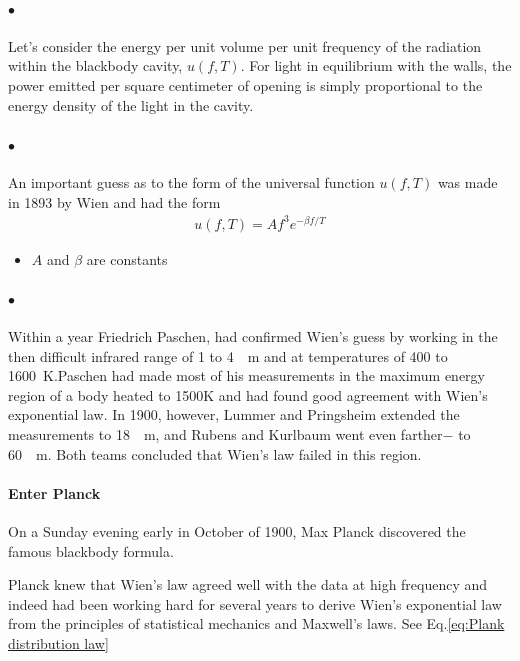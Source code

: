 \documentclass[a4paper]{report}
\begin{document}
            \paragraph{$\bullet$} Let's consider the energy per unit volume per unit frequency of 
            the radiation within the blackbody cavity, $u( f, T )$. For light in equilibrium with 
            the walls, the power emitted per square centimeter of opening is simply proportional to 
            the energy density of the light in the cavity.

            \paragraph{$\bullet$} An important guess as to the form of the universal function $u(f, T)$ was
            made in 1893 by Wien and had the form 
            \begin{align} \label{Wien's exponential law}
                u(f,T) = A f^3 e^{- \beta f/T}
            \end{align}
            {\tiny \begin{itemize}
                \item $A$ and $\beta$ are constants
            \end{itemize}}

            \paragraph{$\bullet$} Within a year Friedrich Paschen, had confirmed Wien’s guess 
            by working in the then difficult infrared range of 1 to \SI{4}{\mu\m} and at temperatures 
            of 400 to \SI{1600}{\K}.Paschen had made most of his 
            measurements in the maximum energy region of a body heated to 1500K and had found good 
            agreement with Wien’s exponential law. In 1900, however, Lummer and Pringsheim extended 
            the measurements to \SI{18}{\mu\m}, and Rubens and Kurlbaum went even farther$-$ to \SI{60}{\mu\m}.
            Both teams concluded that Wien’s law failed in this region.

            \paragraph{\color{c3}Enter Planck}
            On a Sunday evening early in October of 1900, Max Planck discovered the famous blackbody formula.

            Planck knew that Wien’s law agreed well with the data at high frequency and indeed had been 
            working hard for several years to derive Wien’s exponential law from the principles of statistical 
            mechanics and Maxwell’s laws. See Eq.\eqref{eq:Plank distribution law}
            
\end{document}
